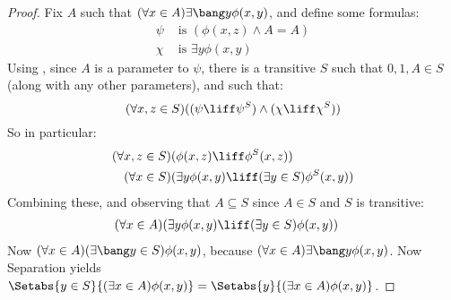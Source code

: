 \documentclass[../../../include/open-logic-section]{subfiles}
\begin{document}
\begin{proof}
	Fix $A$ such that $(\forall x \in A)\exists \bang  y\phi(x,y)$, and define some formulas:
	\begin{align*}
		\psi &\text{ is } (\phi(x, z) \land A = A)\\
		\chi &\text{ is } \exists y \phi(x, y)
	\end{align*}
	Using , since $A$ is a parameter to $\psi$, there is a transitive $S$ such that $0, 1, A \in S$  (along with any other parameters), and such that:
	$$(\forall x,z \in S)((\psi \liff \psi^S) \land (\chi \liff \chi^S))$$
	So in particular:
	\begin{align*}
		(\forall  x, z \in S)(&\phi(x, z) \liff \phi^S(x, z))\\
		(\forall x \in S)(&\exists y\phi(x, y) \liff (\exists y \in S)\phi^S(x, y)) 
	\end{align*}
	Combining these, and observing that $A \subseteq S$ since $A \in S$ and $S$ is transitive:
	\begin{align*}
		(\forall x \in A)(&\exists y\phi(x, y) \liff (\exists y \in S)\phi(x, y))
	\end{align*}
	Now $(\forall x \in A)(\exists \bang y \in S)\phi(x, y)$, because $(\forall x \in A)\exists \bang y \phi(x, y)$. Now Separation yields $\Setabs{y \in S}{(\exists x \in A) \phi(x, y)} = \Setabs{y}{(\exists x \in A) \phi(x, y)}$. 
\end{proof}



\end{document}

